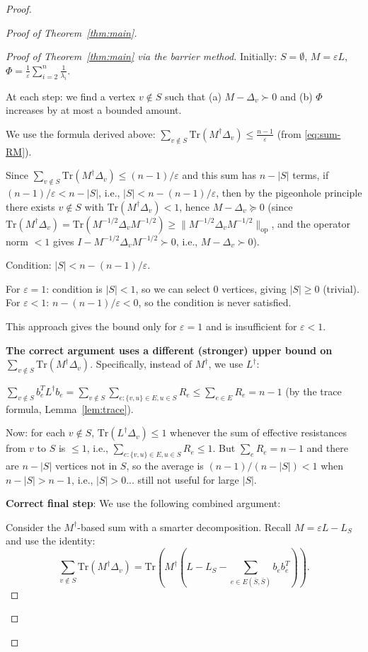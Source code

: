 \documentclass[12pt]{article}
\theoremstyle{definition}
\begin{document}
\begin{proof}
\begin{proof}[Proof of Theorem~\ref{thm:main}]
\begin{proof}[Proof of Theorem~\ref{thm:main} via the barrier method]
Initially: $S=\emptyset$, $M = \varepsilon L$, $\Phi = \frac{1}{\varepsilon}\sum_{i=2}^n\frac{1}{\lambda_i}$.

At each step: we find a vertex $v\notin S$ such that (a) $M - \Delta_v\succ 0$ and (b) $\Phi$ increases by at most a bounded amount.

We use the formula derived above: $\sum_{v\notin S}\mathrm{Tr}(M^\dagger\Delta_v)\leq\frac{n-1}{\varepsilon}$ (from \eqref{eq:sum-RM}).

Since $\sum_{v\notin S}\mathrm{Tr}(M^\dagger\Delta_v)\leq(n-1)/\varepsilon$ and this sum has $n-|S|$ terms, if $(n-1)/\varepsilon < n-|S|$, i.e., $|S| < n - (n-1)/\varepsilon$, then by the pigeonhole principle there exists $v\notin S$ with $\mathrm{Tr}(M^\dagger\Delta_v) < 1$, hence $M-\Delta_v\succeq 0$ (since $\mathrm{Tr}(M^\dagger\Delta_v) = \mathrm{Tr}(M^{-1/2}\Delta_v M^{-1/2})\geq\|M^{-1/2}\Delta_v M^{-1/2}\|_{\mathrm{op}}$, and the operator norm $< 1$ gives $I - M^{-1/2}\Delta_v M^{-1/2}\succ 0$, i.e., $M-\Delta_v\succ 0$).

Condition: $|S| < n - (n-1)/\varepsilon$.

For $\varepsilon = 1$: condition is $|S| < 1$, so we can select 0 vertices, giving $|S|\geq 0$ (trivial).
For $\varepsilon < 1$: $n - (n-1)/\varepsilon < 0$, so the condition is never satisfied.

This approach gives the bound only for $\varepsilon = 1$ and is insufficient for $\varepsilon < 1$.

\textbf{The correct argument uses a different (stronger) upper bound on $\sum_{v\notin S}\mathrm{Tr}(M^\dagger\Delta_v)$}. Specifically, instead of $M^\dagger$, we use $L^\dagger$:

$\sum_{v\notin S}b_e^T L^\dagger b_e = \sum_{v\notin S}\sum_{e:\{v,u\}\in E,u\in S}R_e\leq\sum_{e\in E}R_e = n-1$ (by the trace formula, Lemma~\ref{lem:trace}).

Now: for each $v\notin S$, $\mathrm{Tr}(L^\dagger\Delta_v)\leq 1$ whenever the sum of effective resistances from $v$ to $S$ is $\leq 1$, i.e., $\sum_{e:\{v,u\}\in E,u\in S}R_e\leq 1$. But $\sum_{e}R_e = n-1$ and there are $n-|S|$ vertices not in $S$, so the average is $(n-1)/(n-|S|) < 1$ when $n-|S| > n-1$, i.e., $|S| > 0$... still not useful for large $|S|$.

\textbf{Correct final step}: We use the following combined argument:

Consider the $M^\dagger$-based sum with a smarter decomposition. Recall $M = \varepsilon L - L_S$ and use the identity:
$$\sum_{v\notin S}\mathrm{Tr}(M^\dagger\Delta_v) = \mathrm{Tr}(M^\dagger(L - L_S - \sum_{e\in E(\bar S,\bar S)}b_eb_e^T)).$$


\end{proof}
\end{proof}
\end{proof}
\end{document}
